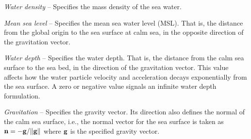 \begin{bulletlist}
\item{\sl Water density} -- Specifies the mass density of the sea water.
\item{\sl Mean sea level} -- Specifies the mean sea water level (MSL).
  That is, the distance from the global origin to the sea surface at calm sea,
  in the opposite direction of the gravitation vector.
\item{\sl Water depth} -- Specifies the water depth.
  That is, the distance from the calm sea surface to the sea bed,
  in the direction of the gravitation vector.
  This value affects how the water particle velocity and acceleration
  decays exponentially from the sea surface.
  A zero or negative value signals an infinite water depth formulation.
\item{\sl Gravitation} -- Specifies the gravity vector.
  Its direction also defines the normal of the calm sea surface, i.e.,
  the normal vector for the sea surface is taken as
  ${\bf n} = -{\bf g}/\|{\bf g}\|$
  where $\bf g$ is the specified gravity vector.



\end{bulletlist}
